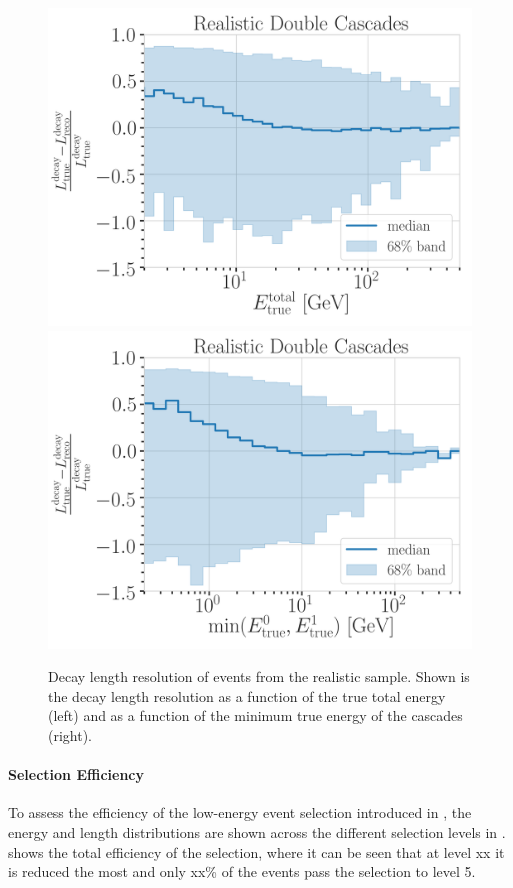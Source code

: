 \begin{figure}[h]
	\centering
    \includegraphics[width=0.49\linewidth]{figures/model_independent_simulation/results/realistic/resolutions/194603_median_decay_length_bias_vs_tot_energy_goodfit_log_unweighted.png}
    \includegraphics[width=0.49\linewidth]{figures/model_independent_simulation/results/realistic/resolutions/194603_median_decay_length_bias_vs_min_energy_goodfit_log_unweighted.png} 
    \caption[Realistic double cascade decay length resolution versus energies]{Decay length resolution of events from the realistic sample. Shown is the decay length resolution as a function of the true total energy (left) and as a function of the minimum true energy of the cascades (right).}
\end{figure}


\paragraph{Selection Efficiency}

To assess the efficiency of the low-energy event selection introduced in , the energy and length distributions are shown across the different selection levels in .  shows the total efficiency of the selection, where it can be seen that at level xx it is reduced the most and only xx\% of the events pass the selection to level 5.

